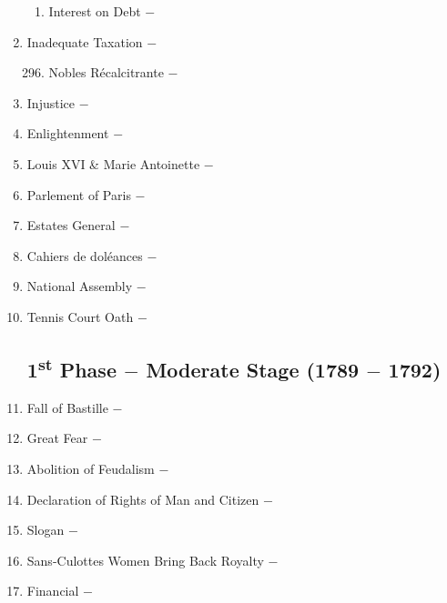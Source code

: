 \documentclass[12pt]{article}
\begin{document}
\begin{enumerate}
\begin{enumerate}[label=\arabic{*}.]
\item Interest on Debt $-$ 

\end{enumerate}
\setcounter{enumi}{294}

\item Inadequate Taxation $-$ 

\begin{enumerate}[label=\arabic{*}.]
\setcounter{enumii}{295}

\item Nobles R\'ecalcitrante $-$

\end{enumerate}
\setcounter{enumi}{296}

\item Injustice $-$

\item Enlightenment $-$ 

\item Louis XVI \& Marie Antoinette $-$

\item Parlement of Paris $-$ 

\item Estates General $-$ 

\item Cahiers de dol\'eances $-$

\item National Assembly $-$

\item Tennis Court Oath $-$ 

\subsection{1\textsuperscript{st} Phase $-$ Moderate Stage (1789 $-$ 1792)}

\item Fall of Bastille $-$ 

\item Great Fear $-$ 

\item Abolition of Feudalism $-$ 

\item Declaration of Rights of Man and Citizen $-$ 

\item Slogan $-$ 

\item Sans-Culottes Women Bring Back Royalty $-$ 

\item Financial $-$ 


\end{enumerate}
\end{document}
